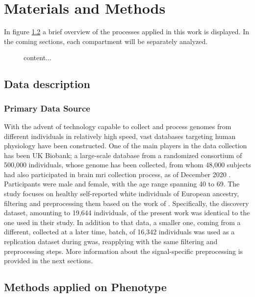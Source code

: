 \chapter{Materials and Methods}\label{chap:mat_and_methods}
In figure \ref{} a brief overview of the processes applied in this work is displayed. In the coming sections, each compartment will be separately analyzed.

\begin{figure}
	content...
\end{figure}


\section{Data description}
\subsection{Primary Data Source}
With the advent of technology capable to collect and process genomes from different individuals in relatively high speed, vast databases targeting human physiology have been constructed. One of the main players in the data collection has been UK Biobank; a large-scale database from a randomized consortium of 500,000 individuals, whose genome has been collected, from whom  48,000 subjects had also participated in brain \ac{mri} collection process, as of December 2020 \cite{Littlejohns2020}. Participants were male and female, with the age range spanning 40 to 69. The study focuses on healthy self-reported white individuals of European ancestry, filtering and preprocessing them based on the work of \citet{Naqvi2021}. Specifically, the discovery dataset, amounting to 19,644 individuals, of the present work was identical to the one used in their study. In addition to that data, a smaller one, coming from a different, collected at a later time, batch, of 16,342 individuals was used as a replication dataset during \ac{gwas}, reapplying with the same filtering and preprocessing steps. More information about the signal-specific preprocessing is provided in the next sections.


\section{Methods applied on Phenotype}
